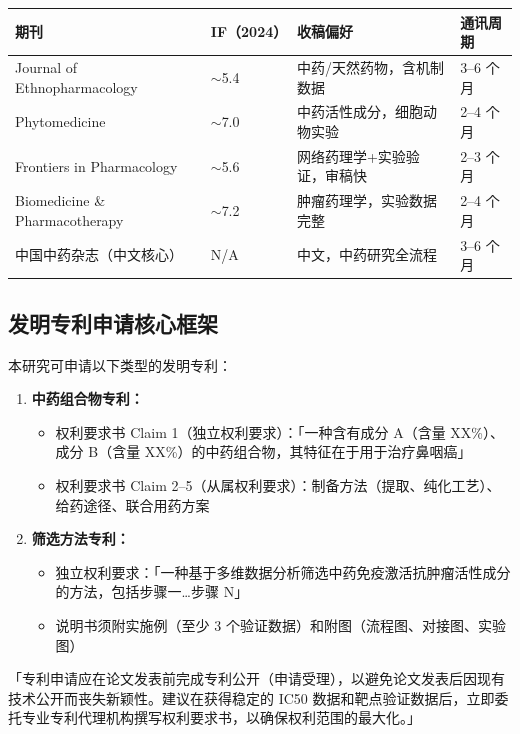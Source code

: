 \documentclass[12pt,a4paper,twoside]{article}
\begin{document}
\begin{center}
\begin{tabular}{llll}
\toprule
\textbf{期刊} & \textbf{IF（2024）} & \textbf{收稿偏好} & \textbf{通讯周期} \\
\midrule
Journal of Ethnopharmacology & $\sim$5.4 & 中药/天然药物，含机制数据 & 3--6 个月 \\
\addlinespace
Phytomedicine & $\sim$7.0 & 中药活性成分，细胞动物实验 & 2--4 个月 \\
\addlinespace
Frontiers in Pharmacology & $\sim$5.6 & 网络药理学+实验验证，审稿快 & 2--3 个月 \\
\addlinespace
Biomedicine \& Pharmacotherapy & $\sim$7.2 & 肿瘤药理学，实验数据完整 & 2--4 个月 \\
\addlinespace
中国中药杂志（中文核心）& N/A & 中文，中药研究全流程 & 3--6 个月 \\
\bottomrule
\end{tabular}
\end{center}

\subsection{发明专利申请核心框架}
\label{sec:module8_patent}

本研究可申请以下类型的发明专利：

\begin{enumerate}
  \item \textbf{中药组合物专利：}
    \begin{itemize}
      \item 权利要求书 Claim 1（独立权利要求）：「一种含有成分 A（含量 XX\%）、成分 B（含量 XX\%）的中药组合物，其特征在于用于治疗鼻咽癌」
      \item 权利要求书 Claim 2--5（从属权利要求）：制备方法（提取、纯化工艺）、给药途径、联合用药方案
    \end{itemize}
  \item \textbf{筛选方法专利：}
    \begin{itemize}
      \item 独立权利要求：「一种基于多维数据分析筛选中药免疫激活抗肿瘤活性成分的方法，包括步骤一…步骤 N」
      \item 说明书须附实施例（至少 3 个验证数据）和附图（流程图、对接图、实验图）
    \end{itemize}
\end{enumerate}

\begin{tipbox}
「专利申请应在论文发表前完成专利公开（申请受理），以避免论文发表后因现有技术公开而丧失新颖性。建议在获得稳定的 IC50 数据和靶点验证数据后，立即委托专业专利代理机构撰写权利要求书，以确保权利范围的最大化。」
\end{tipbox}
\end{document}

